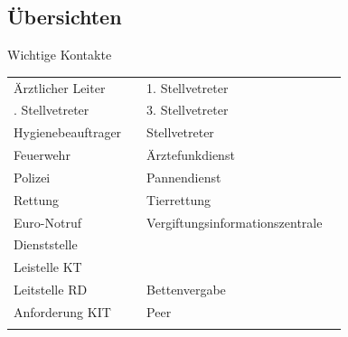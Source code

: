 \begin{WidePar}
\chapter{Übersichten}
\end{WidePar}





\TableWide
{Wichtige Kontakte}%
{}%
{}%
{}%
{}%
{%
\begin{tabularx}{\linewidth}{XXXX}
\toprule\addlinespace
Ärztlicher Leiter &  & 1. Stellvetreter
\\\hhline{~-~-}\addlinespace
2. Stellvetreter &   & 3. Stellvetreter
\\\hhline{~-~-}\addlinespace
Hygienebeauftrager &  & Stellvetreter
\\\addlinespace\midrule\addlinespace
Feuerwehr	&  & Ärztefunkdienst 	&  
\\\hhline{~-~-}\addlinespace
Polizei		&  & Pannendienst		&  
\\\hhline{~-~-}\addlinespace
Rettung		&  & Tierrettung			&  
\\\hhline{~-~-}\addlinespace
Euro-Notruf &  & Vergiftungs\-informations\-zentrale &   
\\\hhline{~-~-}\addlinespace
Dienststelle &  &  & 
\\\hhline{~-~-}\addlinespace
Leistelle KT &  & & 
\\\hhline{~-~-}\addlinespace
Leitstelle RD &  & Bettenvergabe & 
\\\hhline{~-~-}\addlinespace
Anforderung KIT &  & Peer
\\\hhline{~-~-}\addlinespace\bottomrule
\end{tabularx}
}%
{}%


